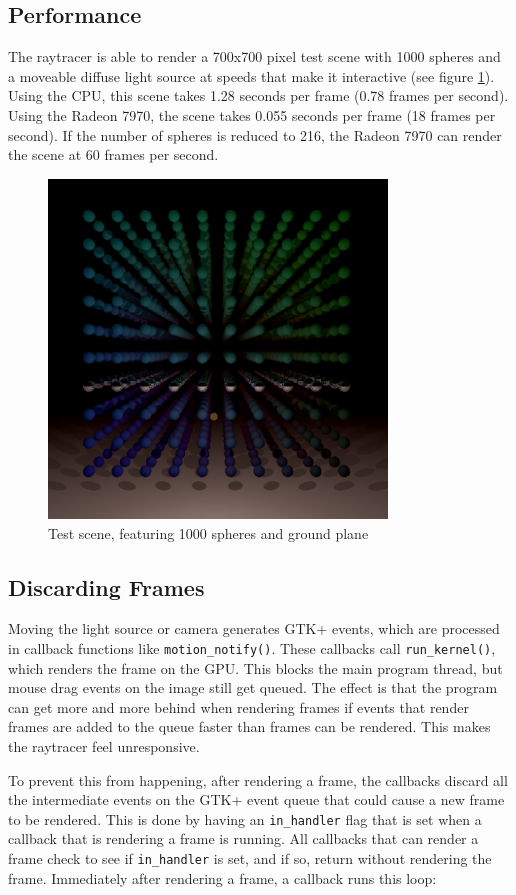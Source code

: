 \documentclass{article}
\begin{document}
\subsection{Performance}
The raytracer is able to render a 700x700 pixel test scene with 1000 spheres and a moveable diffuse light source at speeds that make it interactive (see figure \ref{fig:testscene}). Using the CPU, this scene takes 1.28 seconds per frame (0.78 frames per second). Using the Radeon 7970, the scene takes 0.055 seconds per frame (18 frames per second). If the number of spheres is reduced to 216, the Radeon 7970 can render the scene at 60 frames per second.

\begin{figure}[ht!]
\centering
\includegraphics[width=90mm]{scene.png}
\caption{Test scene, featuring 1000 spheres and ground plane}
\label{fig:testscene}
\end{figure}

\subsection{Discarding Frames}
Moving the light source or camera generates GTK+ events, which are processed in callback functions like \texttt{motion\_notify()}. These callbacks call \texttt{run\_kernel()}, which renders the frame on the GPU. This blocks the main program thread, but mouse drag events on the image still get queued. The effect is that the program can get more and more behind when rendering frames if events that render frames are added to the queue faster than frames can be rendered. This makes the raytracer feel unresponsive.

To prevent this from happening, after rendering a frame, the callbacks discard all the intermediate events on the GTK+ event queue that could cause a new frame to be rendered. This is done by having an \texttt{in\_handler} flag that is set when a callback that is rendering a frame is running. All callbacks that can render a frame check to see if \texttt{in\_handler} is set, and if so, return without rendering the frame. Immediately after rendering a frame, a callback runs this loop:
\end{document}
